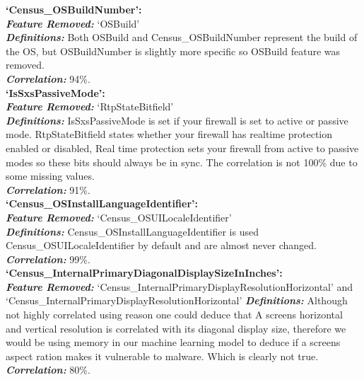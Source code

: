 \documentclass[sigconf]{acmart}
\begin{document}
\begin{center}
\textbf{`Census\_OSBuildNumber':}\\
    \textbf{\textit{Feature Removed: }}`OSBuild'\\
    \textbf{\textit{Definitions:}} Both OSBuild and Census\_OSBuildNumber represent the build of the OS, but OSBuildNumber is slightly more specific so OSBuild feature was removed.\\
    \textbf{\textit{Correlation: }}94\%.\\
    \vspace{5mm}
\textbf{`IsSxsPassiveMode':}\\
    \textbf{\textit{Feature Removed: }}`RtpStateBitfield'\\
    \textbf{\textit{Definitions:}} IsSxsPassiveMode is set if your firewall is set to active or passive mode. RtpStateBitfield states whether your firewall has realtime protection enabled or disabled, Real time protection sets your firewall from active to passive modes so these bits should always be in sync. The correlation is not 100\% due to some missing values.\\
    \textbf{\textit{Correlation: }}91\%.\\
    \vspace{5mm}
\textbf{`Census\_OSInstallLanguageIdentifier':}\\
    \textbf{\textit{Feature Removed: }}`Census\_OSUILocaleIdentifier'\\
    \textbf{\textit{Definitions:}} Census\_OSInstallLanguageIdentifier is used Census\_OSUILocaleIdentifier by default and are almost never changed. \\
    \textbf{\textit{Correlation: }}99\%.\\
    \vspace{5mm}
\textbf{`Census\_InternalPrimaryDiagonalDisplaySizeInInches':}\\
    \textbf{\textit{Feature Removed: }}`Census\_InternalPrimaryDisplayResolutionHorizontal' and \\
    `Census\_InternalPrimaryDisplayResolutionHorizontal'
    \textbf{\textit{Definitions:}} Although not highly correlated using reason one could deduce that A screens horizontal and vertical resolution is correlated with its diagonal display size, therefore we would be using memory in our machine learning model to deduce if a screens aspect ration makes it vulnerable to malware. Which is clearly not true.\\
    \textbf{\textit{Correlation: }}80\%.\\

\end{center}
\end{document}
